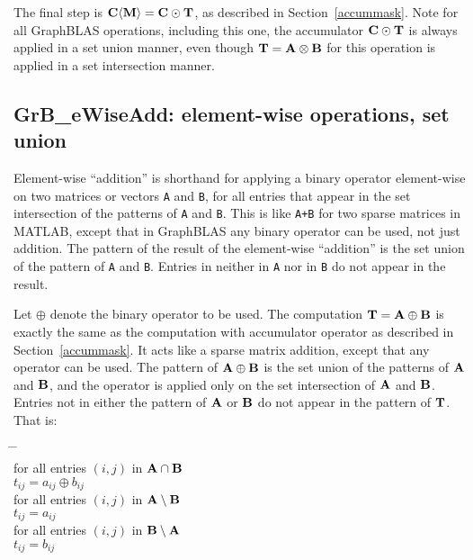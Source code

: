 \documentclass[12pt]{article}
\begin{document}
{The final step is ${\bf C \langle M \rangle  = C \odot T}$, as described in
Section~\ref{accummask}.  Note for all GraphBLAS operations, including this
one, the accumulator ${\bf C \odot T}$ is always applied in a set union manner,
even though ${\bf T = A \otimes B}$ for this operation is applied in a set
intersection manner.

\newpage
\subsection{{\sf GrB\_eWiseAdd:} element-wise operations, set union} %
\label{eWiseAdd}

Element-wise ``addition'' is shorthand for applying a binary operator
element-wise on two matrices or vectors \verb'A' and \verb'B', for all entries
that appear in the set intersection of the patterns of \verb'A' and \verb'B'.
This is like \verb'A+B' for two sparse matrices in MATLAB, except that in
GraphBLAS any binary operator can be used, not just addition.  The pattern of
the result of the element-wise ``addition'' is the set union of the pattern of
\verb'A' and \verb'B'.  Entries in neither in \verb'A' nor in \verb'B' do
not appear in the result.

Let $\oplus$ denote the binary operator to be used.  The computation ${\bf T =
A \oplus B}$ is exactly the same as the computation with accumulator operator
as described in Section~\ref{accummask}.  It acts like a sparse matrix
addition, except that any operator can be used.  The pattern of ${\bf A \oplus
B}$ is the set union of the patterns of ${\bf A}$ and ${\bf B}$, and the
operator is applied only on the set intersection of ${\bf A}$ and ${\bf B}$.
Entries not in either the pattern of ${\bf A}$ or ${\bf B}$ do not appear in
the pattern of ${\bf T}$.  That is:
    \vspace{-0.2in}
    {\small
    \begin{tabbing}
    \hspace{2em} \= \hspace{2em} \= \hspace{2em} \= \\
    \> for all entries $(i,j)$ in ${\bf A \cap B}$ \\
    \> \> $t_{ij} = a_{ij} \oplus b_{ij}$ \\
    \> for all entries $(i,j)$ in ${\bf A \setminus B}$ \\
    \> \> $t_{ij} = a_{ij}$ \\
    \> for all entries $(i,j)$ in ${\bf B \setminus A}$ \\
    \> \> $t_{ij} = b_{ij}$
    \end{tabbing}
    }

}
\end{document}
